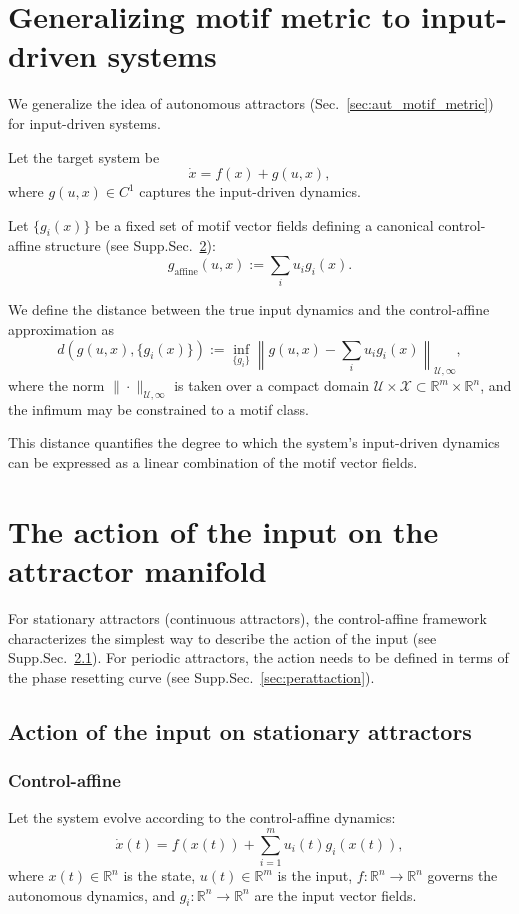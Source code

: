\documentclass{article}
\theoremstyle{definition} \newtheorem{definition}{Definition}  \newtheorem{example}{Example}
\theoremstyle{remark} \newtheorem{remark}{Remark}
\newcounter{ct}
\begin{document}
\newpage

\section{Generalizing motif metric to input-driven systems}
We generalize the idea of autonomous attractors (Sec.~\ref{sec:aut_motif_metric}) for input-driven systems.

Let the target system be
\[
\dot{x} = f(x) + g(u, x),
\]
where \( g(u, x) \in C^1 \) captures the input-driven dynamics.

Let \( \{ g_i(x) \} \) be a fixed set of motif vector fields defining a canonical control-affine structure (see Supp.Sec.~\ref{sec:attaction}):
\[
g_{\text{affine}}(u, x) := \sum_i u_i g_i(x).
\]

We define the distance between the true input dynamics and the control-affine approximation as
\[
d(g(u, x), \{ g_i(x) \}) := \inf_{\{ g_i \}} \left\| g(u, x) - \sum_i u_i g_i(x) \right\|_{\mathcal{U}, \infty},
\]
where the norm \( \| \cdot \|_{\mathcal{U}, \infty} \) is taken over a compact domain \( \mathcal{U} \times \mathcal{X} \subset \mathbb{R}^m \times \mathbb{R}^n \), and the infimum may be constrained to a motif class.

This distance quantifies the degree to which the system's input-driven dynamics can be expressed as a linear combination of the motif vector fields.

\section{The action of the input on the attractor manifold}\label{sec:attaction}
For stationary attractors (continuous attractors), the control-affine framework characterizes the simplest way to describe the action of the input (see Supp.Sec.~\ref{sec:statattaction}).
For periodic attractors, the action needs to be defined in terms of the phase resetting curve (see Supp.Sec.~\ref{sec:perattaction}).


\subsection{Action of the input on  stationary attractors}\label{sec:statattaction}
\subsubsection{Control-affine}\label{sec:controlaffine}
Let the system evolve according to the control-affine dynamics:
\[
\dot{x}(t) = f(x(t)) + \sum_{i=1}^m u_i(t) g_i(x(t)),
\]
where \( x(t) \in \mathbb{R}^n \) is the state, \( u(t) \in \mathbb{R}^m \) is the input, \( f : \mathbb{R}^n \to \mathbb{R}^n \) governs the autonomous dynamics, and \( g_i : \mathbb{R}^n \to \mathbb{R}^n \) are the input vector fields.
\end{document}
